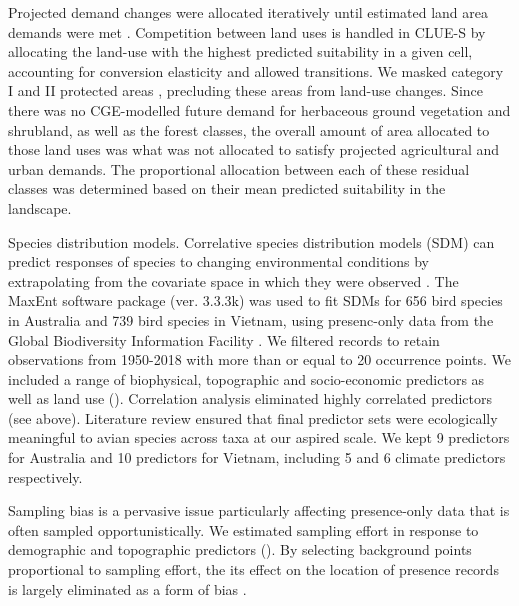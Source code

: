 Projected demand changes were allocated iteratively until estimated land area demands were met \citep{fuchs_high-resolution_2013}. Competition between land uses is handled in CLUE-S by allocating the land-use with the highest predicted suitability in a given cell, accounting for conversion elasticity and allowed transitions. We masked category I and II protected areas \citep{iucn_world_2014}, precluding these areas from land-use changes. Since there was no CGE-modelled future demand for herbaceous ground vegetation and shrubland, as well as the forest classes, the overall amount of area allocated to those land uses was what was not allocated to satisfy projected agricultural and urban demands. The proportional allocation between each of these residual classes was determined based on their mean predicted suitability in the landscape.

Species distribution models. Correlative species distribution models (SDM) can predict responses of species to changing environmental conditions by extrapolating from the covariate space in which they were observed \citep{lawson_prevalence_2014, wintle_fauna_2005, wintle_ecologicaleconomic_2011, thomas_climate_2004}. The MaxEnt software package \citep{phillips_internet_nodate} (ver. 3.3.3k) was used to fit SDMs for 656 bird species in Australia and 739 bird species in Vietnam, using presenc-only data from the Global Biodiversity Information Facility \citep{gbif_gbif_2016}. We filtered records to retain observations from 1950-2018 with more than or equal to 20 occurrence points. We included a range of biophysical, topographic and socio-economic predictors as well as land use (). Correlation analysis eliminated highly correlated predictors (see above). Literature review ensured that final predictor sets were ecologically meaningful to avian species across taxa \citep{gillings_directionality_2015, goetz_relative_2014, maggini_assessing_2014, coxen_species_2017} at our aspired scale. We kept 9 predictors for Australia and 10 predictors for Vietnam, including 5 and 6 climate predictors respectively. 

Sampling bias is a pervasive issue particularly affecting presence-only data that is often sampled opportunistically. We estimated sampling effort in response to demographic and topographic predictors \citep{stolar_accounting_2015} (). By selecting background points proportional to sampling effort, the its effect on the location of presence records is largely eliminated as a form of bias \citep{phillips_sample_2009}.

